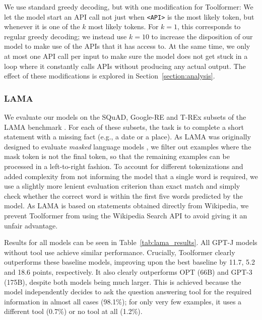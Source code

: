 \documentclass[11pt]{article}
\newcommand{\ours}[0]{Toolformer}
\begin{document}
\begin{CJK*}{UTF8}{gbsn}
We use standard greedy decoding, but with one modification for \ours{}: We let the model start an API call not just when \texttt{<API>} is the most likely token, but whenever it is one of the $k$ most likely tokens. For $k = 1$, this corresponds to regular greedy decoding; we instead use $k = 10$ to increase the disposition of our model to make use of the APIs that it has access to. At the same time, we only at most one API call per input to make sure the model does not get stuck in a loop where it constantly calls APIs without producing any actual output. The effect of these modifications is explored in Section~\ref{section:analysis}.

\subsubsection{LAMA}

We evaluate our models on the SQuAD, Google-RE and T-REx subsets of the LAMA benchmark \citep{petroni-etal-2019-language}. For each of these subsets, the task is to complete a short statement with a missing fact (e.g., a date or a place). 
As LAMA was originally designed to evaluate \emph{masked} language models \citep[e.g.,][]{devlin-etal-2019-bert}, we filter out examples where the mask token is not the final token, so that the remaining examples can be processed in a left-to-right fashion. To account for different tokenizations and added complexity from not informing the model that a single word is required, we use a slightly more lenient evaluation criterion than exact match and simply check whether the correct word is within the first five words predicted by the model. As LAMA is based on statements obtained directly from Wikipedia, we prevent \ours{} from using the Wikipedia Search API to avoid giving it an unfair advantage. 

Results for all models can be seen in Table~\ref{tab:lama_results}. All GPT-J models without tool use achieve similar performance. Crucially, \ours{} clearly outperforms these baseline models, improving upon the best baseline by 11.7, 5.2 and 18.6 points, respectively. It also clearly outperforms OPT (66B) and GPT-3 (175B), despite both models being much larger. This is achieved because the model independently decides to ask the question answering tool for the required information in almost all cases (98.1\%); for only very few examples, it uses a different tool (0.7\%) or no tool at all (1.2\%).


\end{CJK*}
\end{document}
